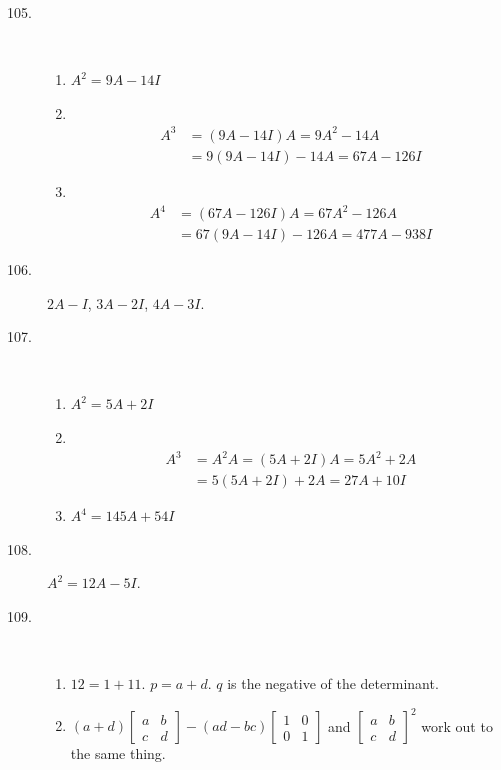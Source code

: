 \documentclass{article}
\begin{document}
\begin{description}

  \item[105.] $\ $
    \begin{enumerate}[\hspace{1cm}(a)]
      \item $A^2 = 9A - 14I$
      \item $\ $
        \begin{align*}
        A^3 & = (9A - 14I) A = 9A^2 - 14A \\ 
            & = 9 (9A - 14I) - 14A = 67A - 126I
        \end{align*}
      \item $\ $
        \begin{align*}
        A^4 & = (67A - 126I) A = 67A^2 - 126A \\ 
            & = 67 (9A - 14I) - 126A = 477A - 938I
        \end{align*}
    \end{enumerate}

  \item[106.] $2A-I$, $3A-2I$, $4A-3I$.

  \item[107.] $\ $
    \begin{enumerate}[\hspace{1cm}(a)]
      \item $A^2 = 5A+ 2I$
      \item $\ $
        \begin{align*}
        A^3 & = A^2A = (5A + 2I) A = 5A^2 + 2A \\ 
            & = 5 (5A + 2I) + 2A = 27A + 10I
        \end{align*}
      \item $A^4 = 145A +54I$
    \end{enumerate}

  \item[108.] $A^2 = 12A - 5I$.

  \item[109.] $\ $
    \begin{enumerate}[\hspace{1cm}(a)]
      \item $12 = 1+11$. $p = a+d$. $q$ is the negative of the determinant.
      \item $(a+d) \begin{bmatrix} a & b \\ c & d \end{bmatrix}  -  (ad-bc) \begin{bmatrix} 1 & 0 \\ 0 & 1 \end{bmatrix}$  and  $\begin{bmatrix} a & b \\ c & d \end{bmatrix}^2$ work out to the same thing.
    \end{enumerate}


\end{description}
\end{document}
